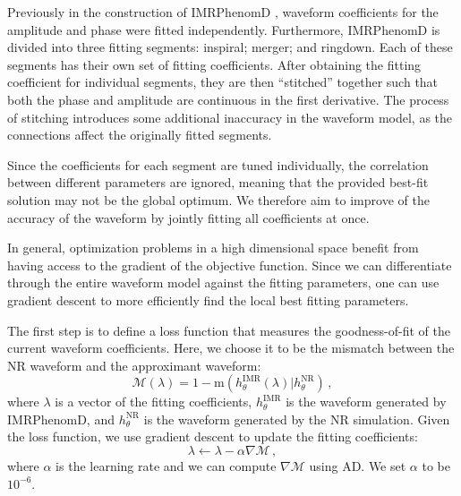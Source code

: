 \documentclass[twocolumn]{aastex631}
\begin{document}
Previously in the construction of IMRPhenomD \citep{Khan:2015jqa}, waveform
coefficients for the amplitude and phase were fitted independently.
Furthermore, IMRPhenomD is divided into three fitting segments: inspiral; merger; and ringdown.
Each of these segments has their own set of fitting coefficients.
After obtaining the fitting coefficient for individual segments, they are then ``stitched'' together such that both the phase and amplitude are continuous in the first derivative.
The process of stitching introduces some additional inaccuracy in the waveform model, as the connections affect the originally fitted segments.

Since the coefficients for each segment are tuned individually, the correlation between different parameters are ignored, meaning that the provided best-fit solution may not be the global optimum. 
We therefore aim to improve of the accuracy of the waveform by jointly fitting all coefficients at once.

In general, optimization problems in a high dimensional space benefit from having access to the gradient of the objective function. 
Since we can differentiate through the entire waveform model against the fitting parameters, one can use gradient descent to more efficiently find the local best fitting parameters.

The first step is to define a loss function that measures the goodness-of-fit of the current waveform coefficients.
Here, we choose it to be the mismatch between the NR waveform and the approximant waveform:
\begin{equation}
    \label{eq:mismatch}
	\mathcal{M}(\lambda)=1-\mathrm{m}(h_{\theta}^{\mathrm{IMR}}(\lambda)|h_{\theta}^{\mathrm{NR}})\,,
\end{equation}
where $\lambda$ is a vector of the fitting coefficients, $h_{\theta}^{\mathrm{IMR}}$ is
the waveform generated by IMRPhenomD, and $h_{\theta}^{\mathrm{NR}}$ is the waveform
generated by the NR simulation. 
Given the loss function, we use gradient descent to update the fitting coefficients:
\begin{equation}
    \label{eq:grad_descent}
	\lambda\leftarrow\lambda-\alpha\nabla\mathcal{M}\,, 
\end{equation}
where $\alpha$ is the learning rate and we can compute $\nabla\mathcal{M}$ using AD. We set $\alpha$ to be $10^{-6}$. 
\end{document}
